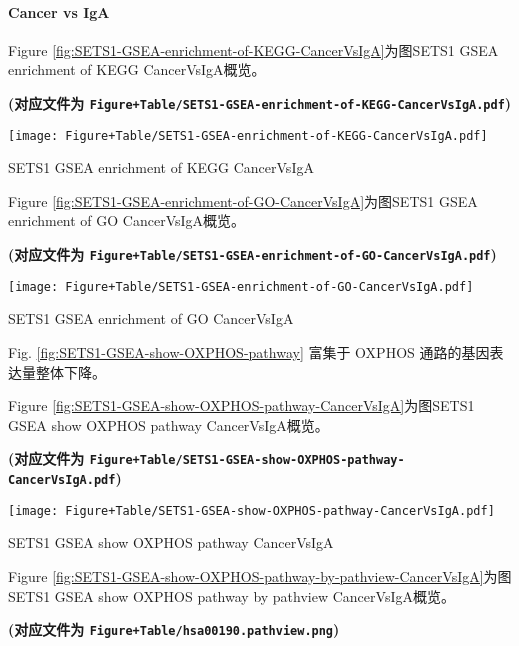 \documentclass[
]{article}
\begin{document}
\hypertarget{cancer-vs-iga}{%
\paragraph{Cancer vs IgA}\label{cancer-vs-iga}}

Figure \ref{fig:SETS1-GSEA-enrichment-of-KEGG-CancerVsIgA}为图SETS1 GSEA enrichment of KEGG CancerVsIgA概览。

\textbf{(对应文件为 \texttt{Figure+Table/SETS1-GSEA-enrichment-of-KEGG-CancerVsIgA.pdf})}

\def\@captype{figure}
\begin{center}
\texttt{[image: Figure+Table/SETS1-GSEA-enrichment-of-KEGG-CancerVsIgA.pdf]}
\caption{SETS1 GSEA enrichment of KEGG CancerVsIgA}\label{fig:SETS1-GSEA-enrichment-of-KEGG-CancerVsIgA}
\end{center}

Figure \ref{fig:SETS1-GSEA-enrichment-of-GO-CancerVsIgA}为图SETS1 GSEA enrichment of GO CancerVsIgA概览。

\textbf{(对应文件为 \texttt{Figure+Table/SETS1-GSEA-enrichment-of-GO-CancerVsIgA.pdf})}

\def\@captype{figure}
\begin{center}
\texttt{[image: Figure+Table/SETS1-GSEA-enrichment-of-GO-CancerVsIgA.pdf]}
\caption{SETS1 GSEA enrichment of GO CancerVsIgA}\label{fig:SETS1-GSEA-enrichment-of-GO-CancerVsIgA}
\end{center}

Fig. \ref{fig:SETS1-GSEA-show-OXPHOS-pathway} 富集于 OXPHOS 通路的基因表达量整体下降。

Figure \ref{fig:SETS1-GSEA-show-OXPHOS-pathway-CancerVsIgA}为图SETS1 GSEA show OXPHOS pathway CancerVsIgA概览。

\textbf{(对应文件为 \texttt{Figure+Table/SETS1-GSEA-show-OXPHOS-pathway-CancerVsIgA.pdf})}

\def\@captype{figure}
\begin{center}
\texttt{[image: Figure+Table/SETS1-GSEA-show-OXPHOS-pathway-CancerVsIgA.pdf]}
\caption{SETS1 GSEA show OXPHOS pathway CancerVsIgA}\label{fig:SETS1-GSEA-show-OXPHOS-pathway-CancerVsIgA}
\end{center}

Figure \ref{fig:SETS1-GSEA-show-OXPHOS-pathway-by-pathview-CancerVsIgA}为图SETS1 GSEA show OXPHOS pathway by pathview CancerVsIgA概览。

\textbf{(对应文件为 \texttt{Figure+Table/hsa00190.pathview.png})}
\end{document}
